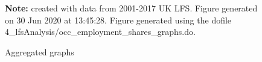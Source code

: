\begin{figure}[!h]
\centering
\caption{Aggregated graphs}
 \\  \\ 
\par \begin{minipage}[h]{\textwidth}{\scriptsize\textbf{Note:} created with data from 2001-2017 UK LFS. Figure generated on 30 Jun 2020 at 13:45:28. Figure generated using the dofile 4\_lfsAnalysis/occ\_employment\_shares\_graphs.do.}\end{minipage}
\end{figure}
